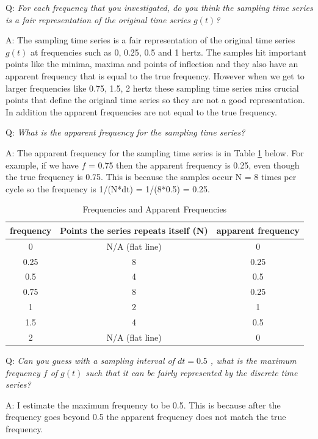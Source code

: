 \documentclass[12pt,a4paper]{article}
\begin{document}
Q: \textit{For each frequency that you investigated, do you think the sampling time series is a fair representation of the original time series $g(t)$?}

A: The sampling time series is a fair representation of the original time series $g(t)$ at frequencies such as 0, 0.25, 0.5 and 1 hertz. The samples hit important points like the minima, maxima and points of inflection and they also have an apparent frequency that is equal to the true frequency. However when we get to larger frequencies like 0.75, 1.5, 2 hertz these sampling time series miss crucial points that define the original time series so they are not a good representation. In addition the apparent frequencies are not equal to the true frequency.

Q: \textit{What is the apparent frequency for the sampling time series?}

A: The apparent frequency for the sampling time series is in Table \ref{table:1} below. For example, if we have $f$ = 0.75 then the apparent frequency is 0.25, even though the true frequency is 0.75. This is because the samples occur N = 8 times per cycle so the frequency is 1/(N*dt) = 1/(8*0.5) = 0.25. \\

\begin{table}[H]
\centering
\begin{tabular}{|c|c|c|}
\hline
frequency & Points the series repeats itself (N) & apparent frequency  \\
\hline\hline
0 & N/A (flat line) & 0 \\
\hline
0.25 & 8 & 0.25  \\
\hline
0.5 & 4 & 0.5  \\
\hline
0.75 & 8 & 0.25 \\
\hline
1 & 2 & 1 \\
\hline
1.5 & 4 & 0.5 \\
\hline
2 & N/A (flat line) & 0 \\
\hline
\end{tabular}
\caption{Frequencies and Apparent Frequencies}
\label{table:1}
\end{table}

Q: \textit{Can you guess with a sampling interval of $dt=0.5$ , what is the maximum frequency $f$ of $g(t)$ such that it can be fairly represented by the discrete time series?}

A: I estimate the maximum frequency to be 0.5. This is because after the frequency goes beyond 0.5 the apparent frequency does not match the true frequency. 
\end{document}
